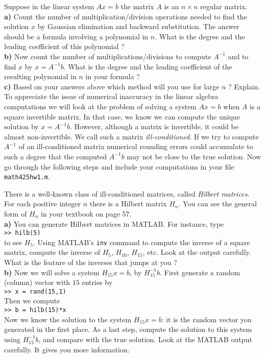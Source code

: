 \documentclass[11pt]{amsart}
\theoremstyle{definition}  %
\begin{document}
 Suppose in the linear system $Ax = b$ the matrix $A$  is an $n \times n$ regular matrix. \\
{\bf a)} Count the number of multiplication/division operations
needed to find the solution $x$ by Gaussian elimination and backward substitution. The answer should be a formula involving a polynomial in $n$.
What is the degree and the leading coefficient of this polynomial ? \\
{\bf b)} Now count the number of multiplications/divisions to compute $A^{-1}$ and to find $x$ by $x=A^{-1}b$. What is the degree and the leading
coefficient of the resulting polynomial in $n$ in your formula ? \\
{\bf c)} Based on your answers above which method will you use for large $n$ ? Explain. \\

 To appreciate the issue of numerical inaccuracy in the linear algebra computations we will look at the problem of 
solving a system $Ax = b$ when $A$ is a square invertible matrix. In that case, we know we can compute the unique solution 
by $ x = A^{-1} b$. However, although a matrix is invertible, it could be almost non-invertible. We call such a matrix {\it ill-conditioned}. 
If we try to compute  $A^{-1}$ of an ill-conditioned matrix numerical rounding errors could accumulate to such a degree that the computed
$A^{-1} b$ may not be close to the true solution. Now go through the following steps and include your computations in your  file {\tt math425hw1.m}.

\vskip 0.1cm
\noindent There is a well-known class of ill-conditioned matrices, called {\it Hilbert matrices}. For each positive integer $n$ there is a Hilbert 
matrix $H_n$. You can see the general form of $H_n$ in your textbook on page 57. \\
{\bf a)} You can generate Hilbert matrices in MATLAB. For instance, 
type \\
{\tt >> hilb(5)} \\
to see $H_5$. Using MATLAB's {\tt inv} command to compute the inverse of a square matrix,  compute the inverse of $H_5$, $H_{10}$, $H_{15}$, etc.
Look at the output carefully. What is the feature of the inverses that jumps at you ?\\
{\bf b)} Now we will solve a system $H_{15}x = b$, by $H_{15}^{-1}b$. First generate a random (column) vector with $15$ entries by  \\
{\tt >> x = rand(15,1) } \\
Then we compute  \\ 
{\tt >> b = hilb(15)*x} \\
Now we know the solution to the system $H_{15}x =b$:  it is the random vector you generated in the first place. As a last step, compute
the solution to this system using $H_{15}^{-1}b$, and compare with the true solution. Look at the MATLAB output carefully. It gives you more information. 
\end{document}
